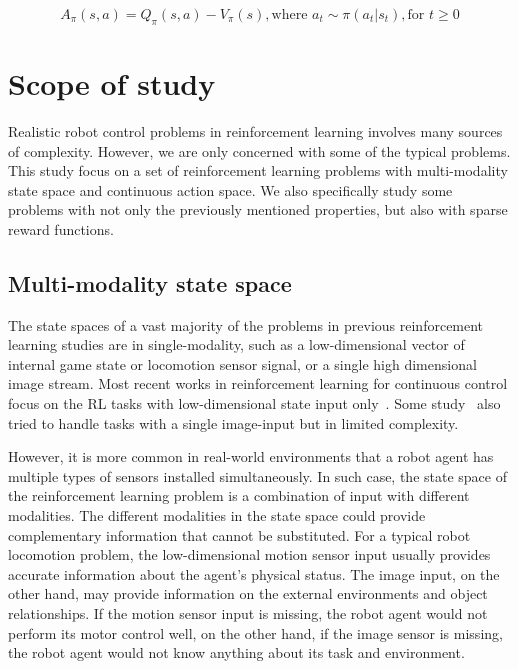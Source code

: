 $$ A_\pi (s,a) = Q_\pi (s,a) - V_\pi (s), \text{where } a_t \sim \pi (a_t|s_t), \text{for } t \geq 0 $$




\section{Scope of study}
Realistic robot control problems in reinforcement learning involves many sources of complexity. However, we are only concerned with some of the typical problems.
This study focus on a set of reinforcement learning problems with multi-modality state space and continuous action space. We also specifically study some problems with not only the previously mentioned properties, but also with sparse reward functions.

\subsection{Multi-modality state space}

The state spaces of a vast majority of the problems in previous reinforcement learning studies are in single-modality, such as a low-dimensional vector of internal game state or locomotion sensor signal, or a single high dimensional image stream. Most recent works in reinforcement learning for continuous control focus on the RL tasks with low-dimensional state input only~\cite{duan2016benchmarking}. Some study~\cite{wu2017scalable} also tried to handle tasks with a single image-input but in limited complexity.

However, it is more common in real-world environments that a robot agent has multiple types of sensors installed simultaneously. In such case, the state space of the reinforcement learning problem is a combination of input with different modalities. The different modalities in the state space could provide complementary information that cannot be substituted. For a typical robot locomotion problem, the low-dimensional motion sensor input usually provides accurate information about the agent's physical status. The image input, on the other hand, may provide information on the external environments and object relationships. If the motion sensor input is missing, the robot agent would not perform its motor control well, on the other hand, if the image sensor is missing, the robot agent would not know anything about its task and environment.


